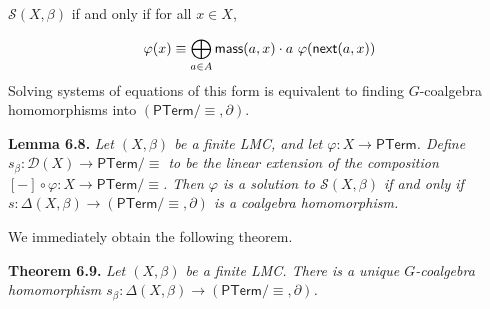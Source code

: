 \documentclass[11pt,a4paper]{amsart}
\begin{document}
\hypertarget{html:S6.SSx1.p4.m5}{}\({\mathcal{S}(X,\beta)}\) if and only if for all %
\hypertarget{html:S6.SSx1.p4.m6}{}\({x\in X}\),
\par\medskip
\hypertarget{html:S6.Ex4}{}   %
\hypertarget{html:S6.Ex4.m1}{}\[\varphi(x)\equiv\bigoplus_{a\in A}\mbox{\sf mass}(a,x)\cdot a\leavevmode\nobreak\ \varphi(\mbox{\sf next}(a,x))\]    Solving systems of equations of this form is equivalent to finding %
\hypertarget{html:S6.SSx1.p4.m7}{}\({G}\)-coalgebra homomorphisms into %
\hypertarget{html:S6.SSx1.p4.m8}{}\({(\mathsf{PTerm}/{\equiv},\partial)}\).
\par\medskip
\hypertarget{html:S6.Thmtheorem8}{} \par\noindent\textbf{\textbf{Lemma 6.8}\textbf{.}}\quad  %
\hypertarget{html:S6.Thmtheorem8.p1}{} \emph{Let %
\hypertarget{html:S6.Thmtheorem8.p1.m1}{}\({(X,\beta)}\) be a finite LMC, and let %
\hypertarget{html:S6.Thmtheorem8.p1.m2}{}\({\varphi\colon X\to\mathsf{PTerm}}\). Define %
\hypertarget{html:S6.Thmtheorem8.p1.m3}{}\({s_{\beta}\colon{\mathcal{D}}(X)\to\mathsf{PTerm}/{\equiv}}\) to be the linear extension of the composition %
\hypertarget{html:S6.Thmtheorem8.p1.m4}{}\({[-]\circ\varphi\colon X\to\mathsf{PTerm}/{\equiv}}\). Then %
\hypertarget{html:S6.Thmtheorem8.p1.m5}{}\({\varphi}\) is a solution to %
\hypertarget{html:S6.Thmtheorem8.p1.m6}{}\({\mathcal{S}(X,\beta)}\) if and only if %
\hypertarget{html:S6.Thmtheorem8.p1.m7}{}\({s\colon\Delta(X,\beta)\to(\mathsf{PTerm}/{\equiv},\partial)}\) is a coalgebra homomorphism.}
\par\medskip
\hypertarget{html:S6.SSx1.p5}{} We immediately obtain the following theorem.
\par\medskip
\hypertarget{html:S6.Thmtheorem9}{} \par\noindent\textbf{\textbf{Theorem 6.9}\textbf{.}}\quad  %
\hypertarget{html:S6.Thmtheorem9.p1}{} \emph{Let %
\hypertarget{html:S6.Thmtheorem9.p1.m1}{}\({(X,\beta)}\) be a finite LMC. There is a unique %
\hypertarget{html:S6.Thmtheorem9.p1.m2}{}\({G}\)-coalgebra homomorphism %
\hypertarget{html:S6.Thmtheorem9.p1.m3}{}\({s_{\beta}\colon\Delta(X,\beta)\to(\mathsf{PTerm}/{\equiv},\partial)}\).}
\end{document}
